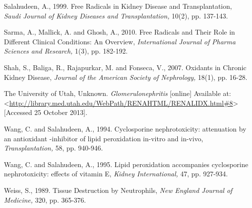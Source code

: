 \documentclass[12pt]{report}
\begin{document}
Salahudeen, A., 1999. Free Radicals in Kidney Disease and Transplantation, \textit{Saudi Journal of Kidney Diseases and Transplantation,} 10(2), pp. 137-143.
\newline
\newline

Sarma, A., Mallick, A. and Ghosh, A., 2010. Free Radicals and Their Role in Different Clinical Conditions: An Overview, \textit{International Journal of Pharma Sciences and Research,} 1(3), pp. 182-192.
\newline
\newline

Shah, S., Baliga, R., Rajapurkar, M. and Fonseca, V., 2007. Oxidants in Chronic Kidney Disease, \textit{Journal of the American Society of Nephrology,} 18(1), pp. 16-28.
\newline
\newline

The University of Utah, Unknown. \textit{Glomerulonephritis} [online] Available at: <\url{http://library.med.utah.edu/WebPath/RENAHTML/RENALIDX.html#8}> [Accessed 25 October 2013].
\newline
\newline

Wang, C. and Salahudeen, A., 1994. Cyclosporine nephrotoxicity: attenuation by an antioxidant -inhibitor of lipid peroxidation in-vitro and in-vivo, \textit{Transplantation,} 58, pp. 940-946.
\newline
\newline

Wang, C. and Salahudeen, A., 1995. Lipid peroxidation accompanies cyclosporine nephrotoxicity: effects of vitamin E, \textit{Kidney International,} 47, pp. 927-934.
\newline
\newline

Weiss, S., 1989. Tissue Destruction by Neutrophils, \textit{New England Journal of Medicine,} 320, pp. 365-376.
\newline
\newline
\end{document}
